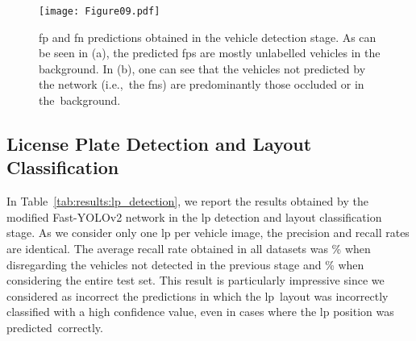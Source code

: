 \begin{figure}[!htb]
    \centering
    
    \texttt{[image: Figure09.pdf]}
    
    \vspace{-2mm}
    
    \caption{\gls*{fp} and \gls*{fn} predictions obtained in the vehicle detection stage. As can be seen in (a), the predicted \glspl*{fp} are mostly unlabelled vehicles in the background. In (b), one can see that the vehicles not predicted by the network (i.e.,~the \glspl*{fn}) are predominantly those occluded or in the~background.}
    \label{fig:results:vehicle_detection_fps_fns}
\end{figure}

\subsection{License Plate Detection and Layout Classification}
\label{sec:results:lp_detection}

In Table~\ref{tab:results:lp_detection}, we report the results obtained by the modified Fast-YOLOv2 network in the \gls*{lp} detection and layout classification stage.
As we consider only one \gls*{lp} per vehicle image, the precision and recall rates are identical.
The average recall rate obtained in all datasets was \% when disregarding the vehicles not detected in the previous stage and \% when considering the entire test set.
This result is particularly impressive since we considered as incorrect the predictions in which the \gls*{lp}~layout was incorrectly classified with a high confidence value, even in cases where the \gls*{lp} position was predicted~correctly.

